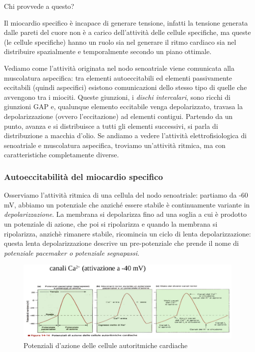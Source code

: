 \documentclass[a4paper,12pt]{article}
\begin{document}
Chi provvede a questo?

Il miocardio specifico è incapace di generare tensione, infatti la tensione generata dalle pareti del cuore non è a carico dell'attività delle cellule specifiche, ma queste (le cellule specifiche) hanno un ruolo sia nel generare il ritmo cardiaco sia nel distribuire spazialmente e temporalmente secondo un piano ottimale.

Vediamo come l'attività originata nel nodo senoatriale viene comunicata alla muscolatura aspecifica: tra elementi autoeccitabili ed elementi passivamente eccitabili (quindi aspecifici) esistono comunicazioni dello stesso tipo di quelle che avvengono tra i miociti. Queste giunzioni, i \emph{dischi intercalari}, sono ricchi di giunzioni GAP e, qualunque elemento eccitabile venga depolarizzato, travasa la depolarizzazione (ovvero l'eccitazione) ad elementi contigui. Partendo da un punto, avanza e si distribuisce a tutti gli elementi successivi, si parla di distribuzione a macchia d'olio. Se andiamo a vedere l'attività elettrofisiologica di senoatriale e muscolatura aspecifica, troviamo un'attività ritmica, ma con caratteristiche completamente diverse.

\subsubsection{Autoeccitabilità del miocardio specifico}
Osserviamo l'attività ritmica di una cellula del nodo senoatriale: partiamo da -60 mV, abbiamo un potenziale che anziché essere stabile è continuamente variante in \emph{depolarizzazione}. La membrana si depolarizza fino ad una soglia a cui è prodotto un potenziale di azione, che poi si ripolarizza e quando la membrana si ripolarizza, anzichè rimanere stabile, ricomincia un ciclo di lenta depolarizzazione: questa lenta depolarizzazione descrive un pre-potenziale che prende il nome di \emph{potenziale pacemaker o potenziale segnapassi}. 
\begin{figure}[H]
\includegraphics[scale=0.5]{immagine/ritmo.jpg}
\caption{Potenziali d'azione delle cellule autoritmiche cardiache}
\end{figure}
\end{document}
